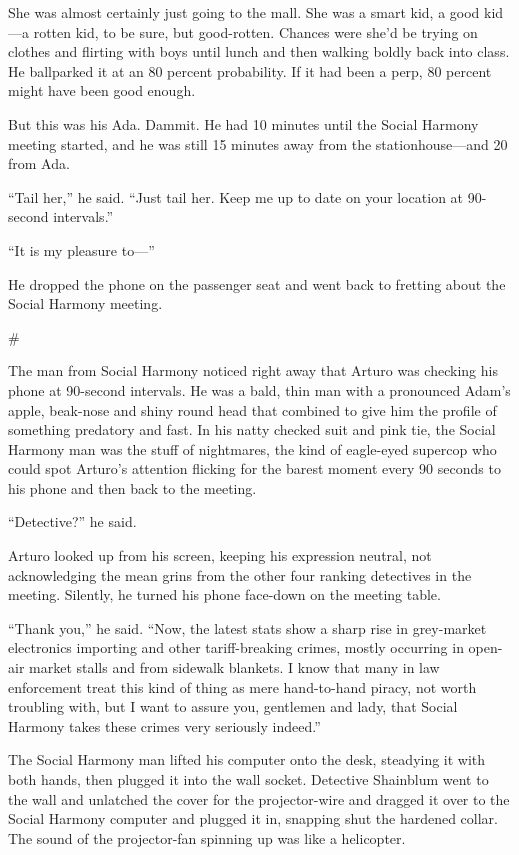 She was almost certainly just going to the mall. She was a smart
kid, a good kid—a rotten kid, to be sure, but good-rotten. Chances
were she’d be trying on clothes and flirting with boys until lunch
and then walking boldly back into class. He ballparked it at an 80
percent probability. If it had been a perp, 80 percent might have
been good enough.

But this was his Ada. Dammit. He had 10 minutes until the Social
Harmony meeting started, and he was still 15 minutes away from the
stationhouse—and 20 from Ada.

“Tail her,” he said. “Just tail her. Keep me up to date on your
location at 90-second intervals.”

“It is my pleasure to—”

He dropped the phone on the passenger seat and went back to
fretting about the Social Harmony meeting.

\#

The man from Social Harmony noticed right away that Arturo was
checking his phone at 90-second intervals. He was a bald, thin man
with a pronounced Adam’s apple, beak-nose and shiny round head that
combined to give him the profile of something predatory and fast.
In his natty checked suit and pink tie, the Social Harmony man was
the stuff of nightmares, the kind of eagle-eyed supercop who could
spot Arturo’s attention flicking for the barest moment every 90
seconds to his phone and then back to the meeting.

“Detective?” he said.

Arturo looked up from his screen, keeping his expression neutral,
not acknowledging the mean grins from the other four ranking
detectives in the meeting. Silently, he turned his phone face-down
on the meeting table.

“Thank you,” he said. “Now, the latest stats show a sharp rise in
grey-market electronics importing and other tariff-breaking crimes,
mostly occurring in open-air market stalls and from sidewalk
blankets. I know that many in law enforcement treat this kind of
thing as mere hand-to-hand piracy, not worth troubling with, but I
want to assure you, gentlemen and lady, that Social Harmony takes
these crimes very seriously indeed.”

The Social Harmony man lifted his computer onto the desk, steadying
it with both hands, then plugged it into the wall socket. Detective
Shainblum went to the wall and unlatched the cover for the
projector-wire and dragged it over to the Social Harmony computer
and plugged it in, snapping shut the hardened collar. The sound of
the projector-fan spinning up was like a helicopter.

